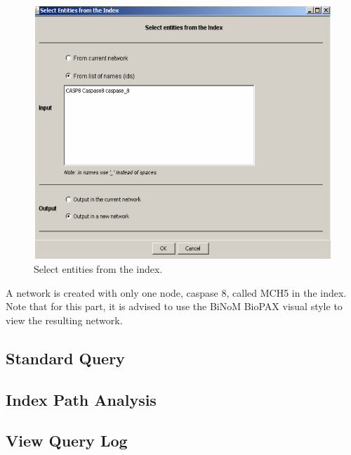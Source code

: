 \begin{figure}[h]
\centering
\includegraphics[width=18 cm]{graphics/Select_entities_from_index}
\caption{Select entities from the index.}
\label{Select_entities_from_index}
\end{figure}
A network is created with only one node, caspase 8, called MCH5 in the index. Note that for this part, it is advised to use the BiNoM BioPAX visual style to view the resulting network.

\subsection{Standard Query}

\subsection{Index Path Analysis}

\subsection{View Query Log}
